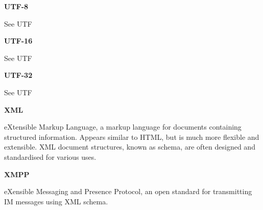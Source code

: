 \textbf{UTF-8}

See UTF

\textbf{UTF-16}

See UTF

\textbf{UTF-32}

See UTF

\textbf{XML}

eXtensible Markup Language, a markup language for documents containing
structured information. Appears similar to HTML, but is much more
flexible and extensible. XML document structures, known as schema, are
often designed and standardised for various uses.

\textbf{XMPP}

eXensible Messaging and Presence Protocol, an open standard for
transmitting IM messages using XML schema.
